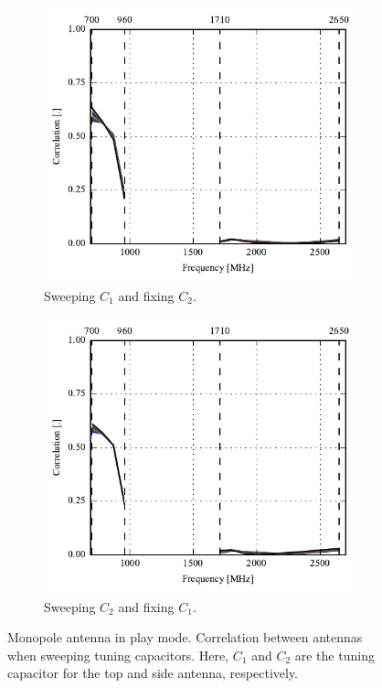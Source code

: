 \begin{figure}[htbp]
    \centering
    \begin{subfigure}{0.49\linewidth}
        \includegraphics{img/tech_sol/monopole/play_mode/s11_corr}
        \caption{Sweeping $C_1$ and fixing $C_2$.}
    \end{subfigure}
    \hfill
    \begin{subfigure}{0.49\linewidth}
        \includegraphics{img/tech_sol/monopole/play_mode/s22_corr}
        \caption{Sweeping $C_2$ and fixing $C_1$.}
    \end{subfigure}
    \caption{Monopole antenna in play mode. Correlation between antennas when sweeping tuning capacitors. Here, $C_1$ and $C_2$ are the tuning capacitor for the top and side antenna, respectively.}
    \label{fig:corr_sol1_play}
\end{figure}

